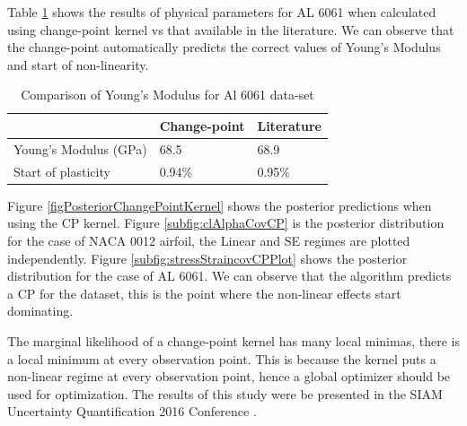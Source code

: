 Table \ref{tabComparisonOfYoungModulus6061Data} shows the results of physical parameters for AL 6061 when calculated using change-point kernel vs that available in the literature. We can observe that the change-point automatically predicts the correct values of Young's Modulus and start of non-linearity.


\begin{table}[!ht]
    \centering
\begin{tabular}{|l|l|l|}
  \hline
    & Change-point & Literature \\
  \hline 
  \hline
Young's Modulus (GPa) &  68.5 & 68.9\\
Start of plasticity  & 0.94\% & 0.95\%\\
   \hline
\end{tabular}
\caption{Comparison of Young's Modulus for Al 6061 data-set}
  \label{tabComparisonOfYoungModulus6061Data}
\end{table}

Figure \ref{figPosteriorChangePointKernel} shows the posterior predictions when using the CP kernel. Figure \ref{subfig:clAlphaCovCP} is the posterior distribution for the case of NACA 0012 airfoil, the Linear and SE regimes are plotted independently. Figure \ref{subfig:stressStraincovCPPlot} shows the posterior distribution for the case of AL 6061. We can observe that the algorithm predicts a CP for the dataset, this is the point where the non-linear effects start dominating. 

The marginal likelihood of a change-point kernel has many local minimas, there is a local minimum at every observation point. This is because the kernel puts a non-linear regime at every observation point, hence a global optimizer should be used for optimization. The results of this study were be presented in the SIAM Uncertainty Quantification 2016 Conference \cite{chiplunkar:hal-01555401}.

